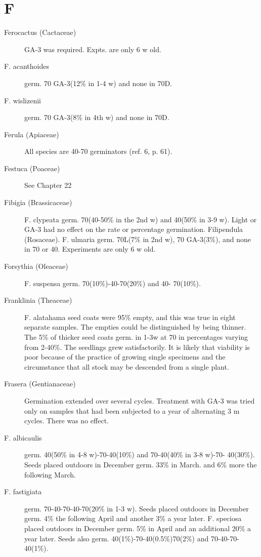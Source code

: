 \section{F}
\begin{description}

\item[Ferocactus (Cactaceae)] GA-3 was required. Expts. are only 6 w old.
\item[F. acanthoides] germ. 70 GA-3(12\% in 1-4 w) and none in 70D.
\item[F. wislizenii] germ. 70 GA-3(8\% in 4th w) and none in 70D.
\item[Ferula (Apiaceae)] All species are 40-70 germinators (ref. 6, p. 61).
\item[Festuca (Poaceae)] See Chapter 22

\item[Fibigia (Brassicaceae)] F. clypeata germ. 70(40-50\% in the 2nd w) and
40(50\% in 3-9 w). Light or GA-3 had no effect on the rate or percentage germination.
Filipendula (Rosaceae). F. ulmaria germ. 70L(7\% in 2nd w), 70 GA-3(3\%),
and none in 70 or 40. Experiments are only 6 w old.

\item[Forsythia (Oleaceae)] F. suspensa germ. 70(10\%)-40-70(20\%) and 40-
70(10\%).

\item[Franklinia (Theaceae)] F. alatahama seed coats were 95\% empty, and this
was true in eight separate samples. The empties could be distinguished by being
thinner. The 5\% of thicker seed coats germ. in 1-3w at 70 in percentages varying from
2-40\%. The seedlings grew satisfactorily. It is likely that viability is poor because of the
practice of growing single specimens and the circumstance that all stock may be
descended from a single plant.

\item[Frasera (Gentianaceae)] Germination extended over several cycles.
Treatment with GA-3 was tried only on samples that had been subjected to a year of
alternating 3 m cycles. There was no effect.

\item[F. albicaulis] germ. 40(50\% in 4-8 w)-70-40(10\%) and 70-40(40\% in 3-8 w)-70-
40(30\%). Seeds placed outdoors in December germ. 33\% in March. and 6\% more the
following March.

\item[F. fastigiata] germ. 70-40-70-40-70(20\% in 1-3 w). Seeds placed outdoors in
December germ. 4\% the following April and another 3\% a year later.
F. speciosa placed outdoors in December germ. 5\% in April and an additional
20\% a year later. Seeds also germ. 40(1\%)-70-40(0.5\%)70(2\%) and 70-40-70-
40(1\%).


\end{description}
